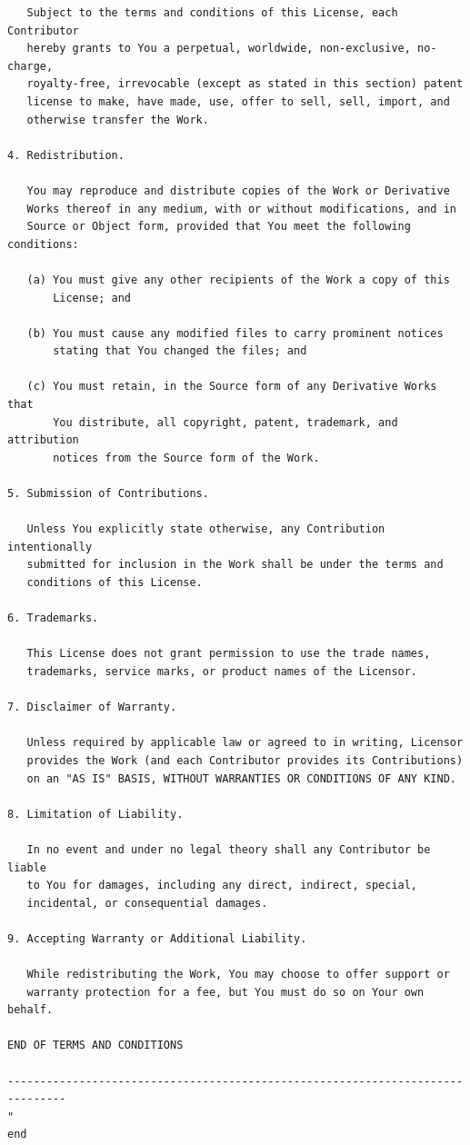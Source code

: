 \documentclass[12pt,a4paper]{article}
\theoremstyle{definition}
\theoremstyle{remark}
\begin{document}
\begin{verbatim}
   Subject to the terms and conditions of this License, each Contributor
   hereby grants to You a perpetual, worldwide, non-exclusive, no-charge,
   royalty-free, irrevocable (except as stated in this section) patent
   license to make, have made, use, offer to sell, sell, import, and
   otherwise transfer the Work.

4. Redistribution.

   You may reproduce and distribute copies of the Work or Derivative
   Works thereof in any medium, with or without modifications, and in
   Source or Object form, provided that You meet the following conditions:

   (a) You must give any other recipients of the Work a copy of this
       License; and

   (b) You must cause any modified files to carry prominent notices
       stating that You changed the files; and

   (c) You must retain, in the Source form of any Derivative Works that
       You distribute, all copyright, patent, trademark, and attribution
       notices from the Source form of the Work.

5. Submission of Contributions.

   Unless You explicitly state otherwise, any Contribution intentionally
   submitted for inclusion in the Work shall be under the terms and
   conditions of this License.

6. Trademarks.

   This License does not grant permission to use the trade names,
   trademarks, service marks, or product names of the Licensor.

7. Disclaimer of Warranty.

   Unless required by applicable law or agreed to in writing, Licensor
   provides the Work (and each Contributor provides its Contributions)
   on an "AS IS" BASIS, WITHOUT WARRANTIES OR CONDITIONS OF ANY KIND.

8. Limitation of Liability.

   In no event and under no legal theory shall any Contributor be liable
   to You for damages, including any direct, indirect, special,
   incidental, or consequential damages.

9. Accepting Warranty or Additional Liability.

   While redistributing the Work, You may choose to offer support or
   warranty protection for a fee, but You must do so on Your own behalf.

END OF TERMS AND CONDITIONS

-------------------------------------------------------------------------------
"
end
\end{verbatim}
\end{document}
